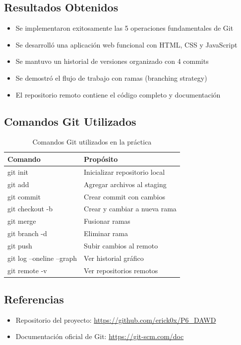 \documentclass[12pt]{article}
\begin{document}
\subsection{Resultados Obtenidos}
\begin{itemize}
    \item Se implementaron exitosamente las 5 operaciones fundamentales de Git
    \item Se desarrolló una aplicación web funcional con HTML, CSS y JavaScript
    \item Se mantuvo un historial de versiones organizado con 4 commits
    \item Se demostró el flujo de trabajo con ramas (branching strategy)
    \item El repositorio remoto contiene el código completo y documentación
\end{itemize}

\subsection{Comandos Git Utilizados}
\begin{table}[H]
    \centering
    \begin{tabular}{|l|l|}
        \hline
        \textbf{Comando} & \textbf{Propósito} \\
        \hline
        git init & Inicializar repositorio local \\
        git add & Agregar archivos al staging \\
        git commit & Crear commit con cambios \\
        git checkout -b & Crear y cambiar a nueva rama \\
        git merge & Fusionar ramas \\
        git branch -d & Eliminar rama \\
        git push & Subir cambios al remoto \\
        git log --oneline --graph & Ver historial gráfico \\
        git remote -v & Ver repositorios remotos \\
        \hline
    \end{tabular}
    \caption{Comandos Git utilizados en la práctica}
\end{table}

\subsection{Referencias}
\begin{itemize}
    \item Repositorio del proyecto: \url{https://github.com/erick0x/P6_DAWD}
    \item Documentación oficial de Git: \url{https://git-scm.com/doc}
\end{itemize}
\end{document}
